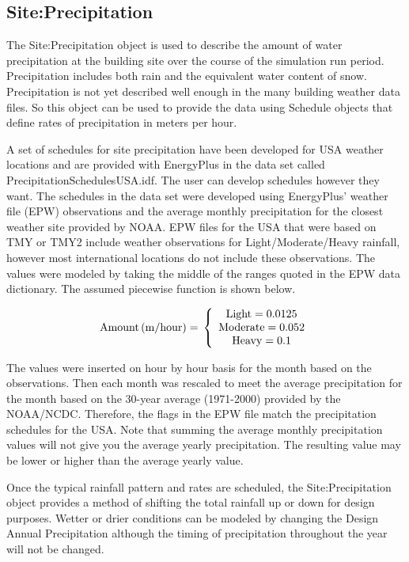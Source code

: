 \subsection{Site:Precipitation}\label{siteprecipitation}

The Site:Precipitation object is used to describe the amount of water precipitation at the building site over the course of the simulation run period. Precipitation includes both rain and the equivalent water content of snow. Precipitation is not yet described well enough in the many building weather data files. So this object can be used to provide the data using Schedule objects that define rates of precipitation in meters per hour.

A set of schedules for site precipitation have been developed for USA weather locations and are provided with EnergyPlus in the data set called PrecipitationSchedulesUSA.idf. The user can develop schedules however they want. The schedules in the data set were developed using EnergyPlus' weather file (EPW) observations and the average monthly precipitation for the closest weather site provided by NOAA. EPW files for the USA that were based on TMY or TMY2 include weather observations for Light/Moderate/Heavy rainfall, however most international locations do not include these observations. The values were modeled by taking the middle of the ranges quoted in the EPW data dictionary. The assumed piecewise function is shown below.

\begin{equation}
\rm{Amount} \, (m/hour) = \, \left\{
  \begin{array}{*{20}{c}}
    \rm{Light} = 0.0125 \\
    \rm{Moderate} = 0.052 \\
    \rm{Heavy} = 0.1
  \end{array}
\right.
\end{equation}

The values were inserted on hour by hour basis for the month based on the observations. Then each month was rescaled to meet the average precipitation for the month based on the 30-year average (1971-2000) provided by the NOAA/NCDC. Therefore, the flags in the EPW file match the precipitation schedules for the USA. Note that summing the average monthly precipitation values will not give you the average yearly precipitation. The resulting value may be lower or higher than the average yearly value.

Once the typical rainfall pattern and rates are scheduled, the Site:Precipitation object provides a method of shifting the total rainfall up or down for design purposes. Wetter or drier conditions can be modeled by changing the Design Annual Precipitation although the timing of precipitation throughout the year will not be changed.

